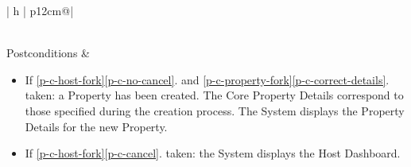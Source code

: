\begin{table}[H]
\begin{tabular}{| h | p{12cm}@\qquad |}
\begin{enumerate}
            \vspace{-0.4cm}
        \end{enumerate}
        \\ \hline
        Postconditions &
        \vspace{-0.3cm}
        \begin{itemize}
            \item If \ref{p-c-host-fork}\ref{p-c-no-cancel}. and \ref{p-c-property-fork}\ref{p-c-correct-details}. taken: a Property has been created. The Core Property Details correspond to those specified during the creation process. The System displays the Property Details for the new Property.
            \item If \ref{p-c-host-fork}\ref{p-c-cancel}. taken: the System displays the Host Dashboard.
            \vspace{-0.4cm}
        \end{itemize}
         \\ \hline
    \end{tabular}
    \caption{Use Case P-C: Register Property}
    \label{use_case_p-c}
  \end{table}

